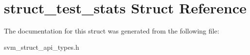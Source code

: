 \hypertarget{structstruct__test__stats}{}\section{struct\+\_\+test\+\_\+stats Struct Reference}
\label{structstruct__test__stats}


The documentation for this struct was generated from the following file\+:\begin{DoxyCompactItemize}
\item 
svm\+\_\+struct\+\_\+api\+\_\+types.\+h\end{DoxyCompactItemize}
